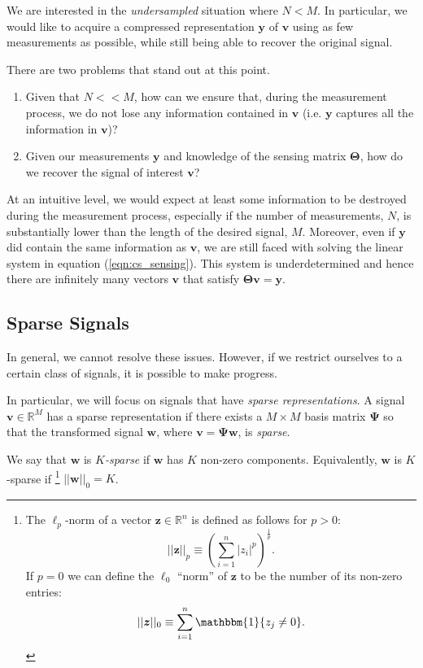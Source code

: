 We are interested in the \emph{undersampled} situation where $N < M$.
In particular, we would like to acquire a compressed representation $\bm y$ of $\bm v$ using as few measurements as possible, while still being able to recover the original signal.

There are two problems that stand out at this point. 
\begin{enumerate}
\item Given that $N << M$, how can we ensure that, during the measurement process, we do not lose any information contained in $\bm v$ (i.e. $\bm y$ captures all the information in $\bm v$)?
\item Given our measurements $\bm y$ and knowledge of the sensing matrix $\bm\Theta$, how do we recover the signal of interest $\bm v$?
\end{enumerate}

At an intuitive level, we would expect at least some information to be destroyed during the measurement process, especially if the number of measurements, $N$, is substantially lower than the length of the desired signal, $M$.
Moreover, even if $\bm y$ did contain the same information as $\bm v$, we are still faced with solving the linear system in equation (\ref{eqn:cs_sensing}).
This system is underdetermined and hence there are infinitely many vectors $\bm v$ that satisfy $\bm\Theta\bm v=\bm y$. 

\subsection{Sparse Signals}
In general, we cannot resolve these issues.
However, if we restrict ourselves to a certain class of signals, it is possible to make progress.

In particular, we will focus on signals that have \emph{sparse representations}.
A signal $\bm v \in\mathbb{R}^M$ has a sparse representation if there exists a $M\times M$ basis matrix $\bm\Psi$ so that the transformed signal $\bm w$, where $\bm v = \bm\Psi\bm w$, is \emph{sparse}.

We say that $\bm w$ is \emph{$K$-sparse} if $\bm w$ has $K$ non-zero components.
Equivalently, $\bm w$ is $K$-sparse if 
\footnote{The $\ell_p$-norm of a vector $\bm z \in\mathbb{R}^n$ is defined as follows for $p>0$:
\begin{equation*}
\label{eqn:lp-norm}
  ||\bm z||_p \equiv \left( \sum_{i=1}^n |z_i|^p \right)^\frac{1}{p}.
\end{equation*}
If $p=0$ we can define the $\ell_0$ ``norm'' of $\bm z$ to be the number of its non-zero entries:
\begin{equation*}
\label{eqn:l0-norm}
  ||\bm z||_0 \equiv  \sum_{i=1}^n \mathbbm{1}\{z_j \neq 0\}.
\end{equation*}
}
$||\bm w||_0 = K$.

